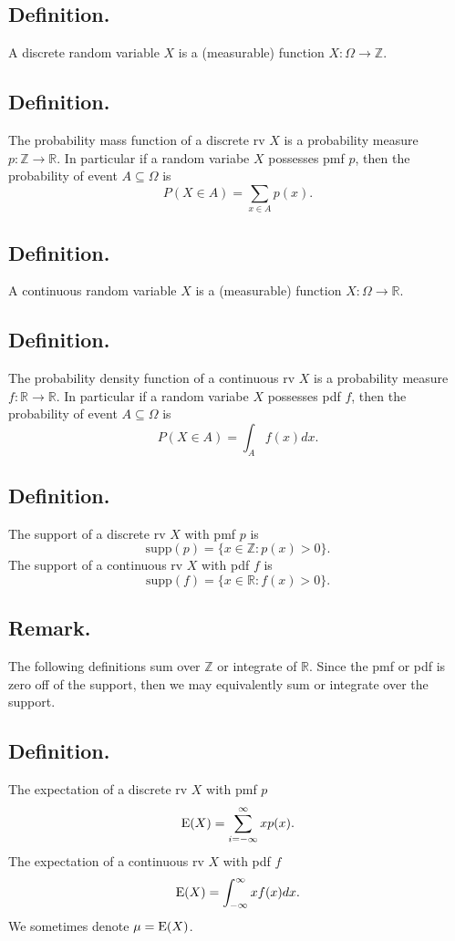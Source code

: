 \documentclass[titlepage]{article}
\begin{document}
\subsection{Definition.} A discrete random variable $X$ is a (measurable) function $X: \Omega \to \mathbb{Z}.$

\subsection{Definition.} The probability mass function of a discrete rv $X$ is a probability measure $p: \mathbb{Z} \to \mathbb{R}$. In particular if a random variabe $X$ possesses pmf $p$, then the probability of event $A \subseteq \Omega$ is
$$P(X \in A) = \sum_{x \in A}p(x).$$

\subsection{Definition.} A continuous random variable $X$ is a (measurable) function $X: \Omega \to \mathbb{R}.$

\subsection{Definition.} The probability density function of a continuous rv $X$ is a probability measure $f: \mathbb{R} \to \mathbb{R}$. In particular if a random variabe $X$ possesses pdf $f$, then the probability of event $A \subseteq \Omega$ is 
$$P(X \in A) = \int_{A}f(x)dx.$$

\subsection{Definition.} The support of a discrete rv $X$ with pmf $p$ is  
$$\text{supp}(p) = \{x \in \mathbb{Z} : p(x) > 0\}.$$
The support of a continuous rv $X$ with pdf $f$ is
$$\text{supp}(f) = \{x \in \mathbb{R} : f(x) > 0\}.$$

\subsection{Remark.} The following definitions sum over $\mathbb{Z}$ or integrate of $\mathbb{R}$. Since the pmf or pdf is zero off of the support, then we may equivalently sum or integrate over the support.

\subsection{Definition.} The expectation of a discrete rv $X$ with pmf $p$
$$\text{E}(X) = \sum_{i=-\infty}^{\infty}xp(x).$$
The expectation of a continuous rv $X$ with pdf $f$
$$\text{E}(X) = \int_{-\infty}^{\infty}xf(x)dx.$$
We sometimes denote $\mu = \text{E}(X)$.
\end{document}
